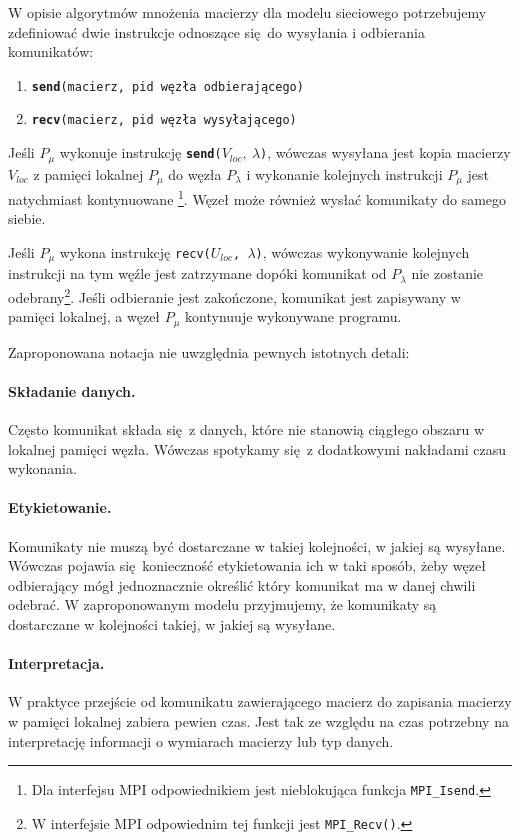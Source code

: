 W opisie algorytmów mnożenia macierzy dla modelu sieciowego potrzebujemy zdefiniować dwie instrukcje odnoszące się do wysyłania i odbierania komunikatów:
\begin{enumerate}
 \item \texttt{\textbf{send}({macierz}, {pid węzła odbierającego})}
 \item \texttt{\textbf{recv}({macierz}, {pid węzła wysyłającego})}
\end{enumerate}

Jeśli \(P_\mu\) wykonuje instrukcję \texttt{\textbf{send}(}\(V_{loc},\:\lambda\)\texttt{)}, wówczas wysyłana jest kopia macierzy \(V_{loc}\) z pamięci lokalnej \(P_\mu\) do węzła \(P_\lambda\) i wykonanie kolejnych instrukcji \(P_\mu\) jest natychmiast kontynuowane \footnote{Dla interfejsu MPI odpowiednikiem jest nieblokująca funkcja \texttt{MPI\_Isend}.}. Węzeł może również wysłać komunikaty do samego siebie.


Jeśli \(P_\mu\) wykona instrukcję \texttt{recv(\(U_{loc}\), \(\lambda\))}, wówczas wykonywanie kolejnych instrukcji na tym węźle jest zatrzymane dopóki komunikat od \(P_\lambda\) nie zostanie odebrany\footnote{W interfejsie MPI odpowiednim tej funkcji jest \texttt{MPI\_Recv()}.}. Jeśli odbieranie jest zakończone, komunikat jest zapisywany w pamięci lokalnej, a węzeł \(P_\mu\) kontynuuje wykonywane programu.

\begin{uwaga}
Zaproponowana notacja nie uwzględnia pewnych istotnych detali:

\paragraph{Składanie danych.} Często komunikat składa się z danych, które nie stanowią ciągłego obszaru w lokalnej pamięci węzła. Wówczas spotykamy się z dodatkowymi nakładami czasu wykonania.
\paragraph{Etykietowanie.} Komunikaty nie muszą być dostarczane w takiej kolejności, w jakiej są wysyłane. Wówczas pojawia się konieczność etykietowania ich w taki sposób, żeby węzeł odbierający mógł jednoznacznie określić który komunikat ma w danej chwili odebrać. W zaproponowanym modelu przyjmujemy, że komunikaty są dostarczane w kolejności takiej, w jakiej są wysyłane.
\paragraph{Interpretacja.} W praktyce przejście od komunikatu zawierającego macierz do zapisania macierzy w pamięci lokalnej zabiera pewien czas. Jest tak ze względu na czas potrzebny na interpretację informacji o wymiarach macierzy lub typ danych.
\end{uwaga}

